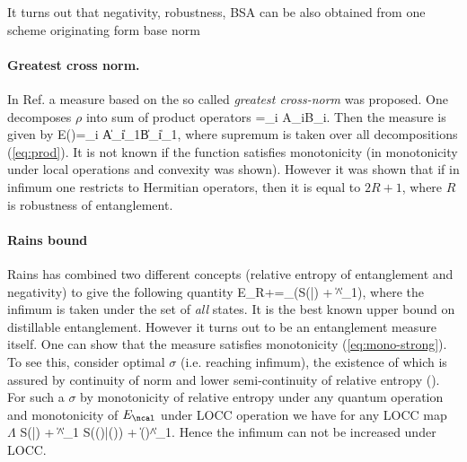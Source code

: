 \documentclass[rmp,12pt,preprint]{revtex4-2}
\begin{document}
It turns out that negativity, robustness, BSA can be also obtained from one
scheme originating form base norm \cite{Vidal-Werner,PlenioVirmani2006-review}

\paragraph{Greatest cross norm.}
In Ref. \cite{Rudolph2001-measureJMP} a measure based on the so called {\it greatest cross-norm} was
proposed. One decomposes $\rho$ into sum of product operators
\be
\rho=\sum_i A_i\ot B_i.
\label{eq:prod}
\ee
Then the measure is given by
\be
E(\rho)=\sup\sum_i \|A_i\|_1\cdot \|B_i\|_1,
\ee
where supremum is taken over all decompositions (\ref{eq:prod}).
It is not known if the function satisfies monotonicity (in \cite{Rudolph2001-measureJMP} monotonicity under local operations
and convexity was shown).
However it was shown \cite{Rudolph2002-criterion} that  if in infimum one restricts to Hermitian operators,
then it is equal to $2R+1$, where $R$ is robustness of entanglement.

\paragraph{Rains bound}
Rains \cite{Rains2001}  has combined two different concepts (relative entropy of entanglement
and negativity) to give the following quantity
\be
E_{R+\ncal}=\inf_\sigma \left(S(\varrho|\sigma) + \|\sigma^\Gamma\|_1\right),
\ee
where the infimum is taken under the set of {\it all} states.
It is the best known upper bound on distillable entanglement. However it
turns out to be an entanglement measure itself.  One can show that
the measure satisfies  monotonicity (\ref{eq:mono-strong}).
To see this, consider optimal $\sigma$ (i.e. reaching infimum),  the existence of which is assured by continuity of norm and lower semi-continuity of relative
entropy (\cite{OhyaPetz}). For such a $\sigma$ by monotonicity of relative entropy under any
quantum operation and monotonicity of $E_\ncal$ under LOCC operation we have for any LOCC map $\Lambda$
\be
 S(\varrho|\sigma) + \|\sigma^{\Gamma}\|_1 \geq
 S(\Lambda(\varrho)|\Lambda(\sigma)) + \|\Lambda(\sigma)^{\Gamma}\|_1.
\ee
Hence the infimum  can not be increased under LOCC.
\end{document}
